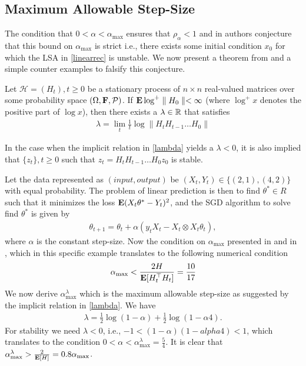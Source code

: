 \subsection{Maximum Allowable Step-Size}
The condition that $0<\alpha<\alpha_{\max}$ ensures that $\rho_{\alpha}<1$ and in \cite{} authors conjecture that this bound on $\alpha_{\max}$ is strict i.e., there exists some initial condition $x_0$ for which the LSA in \eqref{linearrec} is unstable. We now present a theorem from \cite{} and a simple counter examples to falsify this conjecture.
\begin{theorem}\label{explog}
Let $\mathcal{H}=(H_t), t\geq 0$ be a stationary process of $n\times n$ real-valued matrices over some probability space $(\Omega,\mathbf{F},\mathcal{P})$. If $\mathbf{E}\log^+\parallel H_0\parallel<\infty$ (where $\log^+ x$ denotes the positive part of $\log x$), then there exists a $\lambda\in \mathbb{R}$ that satisfies
\begin{align}\label{lambda}
\lambda=\lim_{t}\frac{1}{t}\log\parallel H_t H_{t-1}\ldots H_0\parallel
\end{align}
\end{theorem}
In the case when the implicit relation in \eqref{lambda} yields a $\lambda<0$, it is also implied that $\{z_t\},t\geq 0$ such that $z_t=H_t H_{t-1}\ldots H_0z_0$ is stable.
\begin{example}
Let the data represented as $(input,output)$ be $(X_t,Y_t)\in \{(2,1), (4,2)\}$ with equal probability. The problem of linear prediction is then to find $\theta^*\in R$ such that it minimizes the loss $\mathbf{E}(X_t \theta^* -Y_t)^2$, and the SGD algorithm to solve find $\theta^*$ is given by
\begin{align}
\theta_{t+1}=\theta_t+\alpha(y_t X_t-X_t\otimes X_t\theta_t),
\end{align}
where $\alpha$ is the constant step-size. Now the condition on $\alpha_{\max}$ presented in \Cref{} and in \cite{},  which in this specific example translates to the following numerical condition 
\begin{align*}
\alpha_{\max}<\frac{2H}{\mathbf{E}[H_t^\top H_t]}=\frac{10}{17}
\end{align*}
We now derive $\alpha^{\lambda}_{\max}$ which is the maximum allowable step-size as suggested by the implicit relation in \eqref{lambda}. We have
\begin{align}
\lambda=\frac{1}{2}\log(1-\alpha)+\frac{1}{2}\log(1-\alpha 4).
\end{align}
For stability we need $\lambda<0$, i.e., $-1<(1-\alpha)(1-alpha 4)<1$, which translates to the condition $0<\alpha<\alpha^{\lambda}_{\max}=\frac{5}{4}$. It is clear that $\alpha^{\lambda}_{\max}>\frac{2}{\mathbf{E}[H]}=0.8\alpha_{\max}$.
\end{example}
